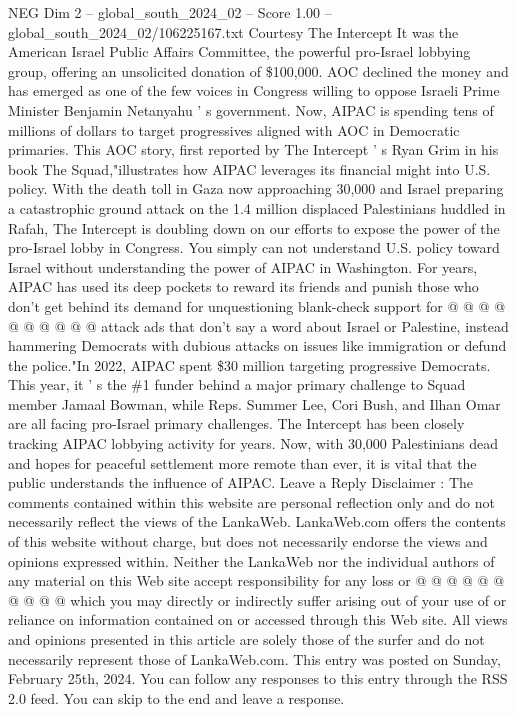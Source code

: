 \begin{textsample}{NEG Dim 2 – global\_south\_2024\_02 – Score 1.00 – global\_south\_2024\_02/106225167.txt}  \label{ex:f2_neg_412}
Courtesy The Intercept It was the American Israel Public Affairs Committee, the powerful pro-Israel lobbying group, offering an unsolicited donation of \$100,000.
AOC declined the money and has emerged as one of the few voices in Congress willing to oppose Israeli Prime Minister Benjamin Netanyahu ' s government.
Now, AIPAC is spending tens of millions of dollars to target progressives aligned with AOC in Democratic primaries.
This AOC story, first reported by The Intercept ' s Ryan Grim in his book The Squad,"illustrates how AIPAC leverages its financial might into U.S. policy.
With the death toll in Gaza now approaching 30,000 and Israel preparing a catastrophic ground attack on the 1.4 million displaced Palestinians huddled in Rafah, The Intercept is doubling down on our efforts to expose the power of the pro-Israel lobby in Congress.
You simply can not understand U.S. policy toward Israel without understanding the power of AIPAC in Washington.
For years, AIPAC has used its deep pockets to reward its friends and punish those who don't get behind its demand for unquestioning blank-check support for @ @ @ @ @ @ @ @ @ @ attack ads that don't say a word about Israel or Palestine, instead hammering Democrats with dubious attacks on issues like immigration or defund the police."In 2022, AIPAC spent \$30 million targeting progressive Democrats.
This year, it ' s the \#1 funder behind a major primary challenge to Squad member Jamaal Bowman, while Reps.
Summer Lee, Cori Bush, and Ilhan Omar are all facing pro-Israel primary challenges.
The Intercept has been closely tracking AIPAC lobbying activity for years.
Now, with 30,000 Palestinians dead and hopes for peaceful settlement more remote than ever, it is vital that the public understands the influence of AIPAC.
Leave a Reply Disclaimer : The comments contained within this website are personal reflection only and do not necessarily reflect the views of the LankaWeb.
LankaWeb.com offers the contents of this website without charge, but does not necessarily endorse the views and opinions expressed within.
Neither the LankaWeb nor the individual authors of any material on this Web site accept responsibility for any loss or @ @ @ @ @ @ @ @ @ @ which you may directly or indirectly suffer arising out of your use of or reliance on information contained on or accessed through this Web site.
All views and opinions presented in this article are solely those of the surfer and do not necessarily represent those of LankaWeb.com.
This entry was posted on Sunday, February 25th, 2024.
You can follow any responses to this entry through the RSS 2.0 feed.
You can skip to the end and leave a response.

\end{textsample}
